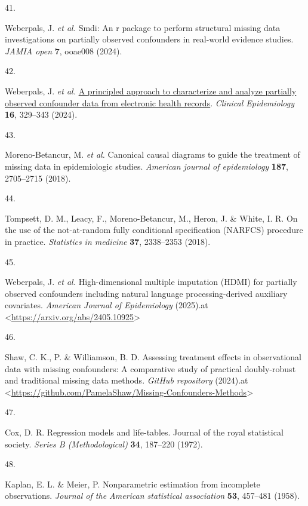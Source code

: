 \documentclass[
  letterpaper,
  DIV=11,
  numbers=noendperiod]{scrartcl}
\newlength{\cslhangindent}
\newlength{\csllabelwidth}
\newenvironment{CSLReferences}[2] %
 {\begin{list}{}{%
  \setlength{\itemindent}{0pt}
  \setlength{\leftmargin}{0pt}
  \setlength{\parsep}{0pt}
  \ifodd #1
   \setlength{\leftmargin}{\cslhangindent}
   \setlength{\itemindent}{-1\cslhangindent}
  \fi
  \setlength{\itemsep}{#2\baselineskip}}}
 {\end{list}}
\newcommand{\CSLLeftMargin}[1]{\parbox[t]{\csllabelwidth}{\strut#1\strut}}
\newcommand{\CSLRightInline}[1]{\parbox[t]{\linewidth - \csllabelwidth}{\strut#1\strut}}
\begin{document}
\begin{CSLReferences}{0}{0}
\CSLLeftMargin{41. }%
\CSLRightInline{Weberpals, J. \emph{et al.} Smdi: An r package to
perform structural missing data investigations on partially observed
confounders in real-world evidence studies. \emph{JAMIA open}
\textbf{7}, ooae008 (2024).}

\CSLLeftMargin{42. }%
\CSLRightInline{Weberpals, J. \emph{et al.}
\href{https://doi.org/10.2147/CLEP.S436131}{A principled approach to
characterize and analyze partially observed confounder data from
electronic health records}. \emph{Clinical Epidemiology} \textbf{16},
329--343 (2024).}

\CSLLeftMargin{43. }%
\CSLRightInline{Moreno-Betancur, M. \emph{et al.} Canonical causal
diagrams to guide the treatment of missing data in epidemiologic
studies. \emph{American journal of epidemiology} \textbf{187},
2705--2715 (2018).}

\CSLLeftMargin{44. }%
\CSLRightInline{Tompsett, D. M., Leacy, F., Moreno-Betancur, M., Heron,
J. \& White, I. R. On the use of the not-at-random fully conditional
specification (NARFCS) procedure in practice. \emph{Statistics in
medicine} \textbf{37}, 2338--2353 (2018).}

\CSLLeftMargin{45. }%
\CSLRightInline{Weberpals, J. \emph{et al.} High-dimensional multiple
imputation (HDMI) for partially observed confounders including natural
language processing-derived auxiliary covariates. \emph{American Journal
of Epidemiology} (2025).at
\textless{}\url{https://arxiv.org/abs/2405.10925}\textgreater{}}

\CSLLeftMargin{46. }%
\CSLRightInline{Shaw, C. K., P. \& Williamson, B. D. Assessing treatment
effects in observational data with missing confounders: A comparative
study of practical doubly-robust and traditional missing data methods.
\emph{GitHub repository} (2024).at
\textless{}\url{https://github.com/PamelaShaw/Missing-Confounders-Methods}\textgreater{}}

\CSLLeftMargin{47. }%
\CSLRightInline{Cox, D. R. Regression models and life-tables. Journal of
the royal statistical society. \emph{Series B (Methodological)}
\textbf{34}, 187--220 (1972).}

\CSLLeftMargin{48. }%
\CSLRightInline{Kaplan, E. L. \& Meier, P. Nonparametric estimation from
incomplete observations. \emph{Journal of the American statistical
association} \textbf{53}, 457--481 (1958).}


\end{CSLReferences}
\end{document}
